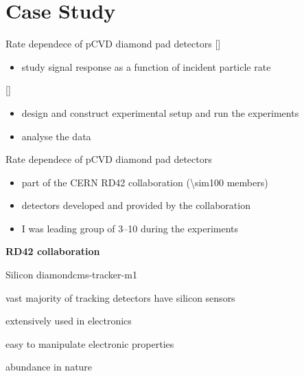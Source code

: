 \section{Case Study}
\begin{frame}{Rate dependece of pCVD diamond pad detectors}
%
%
  [\Large]\vspace*{1ex}
  \begin{itemize}
    \item study signal response as a function of incident particle rate
  \end{itemize}\vspace*{2ex}
%
  [\Large]\vspace*{1ex}
  \begin{itemize}\itemfill
    \item design and construct experimental setup and run the experiments
    \item analyse the data
  \end{itemize}
%
\end{frame}
\begin{frame}{Rate dependece of pCVD diamond pad detectors}
%
  \begin{minipage}{.6\textwidth}
    \begin{itemize}\itemspace{2ex}
      \item part of the CERN RD42 collaboration (\num{\sim100} members)
      \item detectors developed and provided by the collaboration
      \item I was leading group of \numrange{3}{10} during the experiments
    \end{itemize}
  \end{minipage}
  \begin{minipage}{.35\textwidth}\centering
    \Large\bfseries RD42 collaboration\vspace*{-2ex}
  \end{minipage}
%
\end{frame}
\begin{bframe}{Silicon \ra diamond}{cms-tracker-m}{1}
%
  \begin{bbox}{.45}
    \item vast majority of tracking detectors have silicon sensors
    \item extensively used in electronics
    \item easy to manipulate electronic properties
    \item abundance in nature
    \item<2> 
  \end{bbox}
%
\end{bframe}
